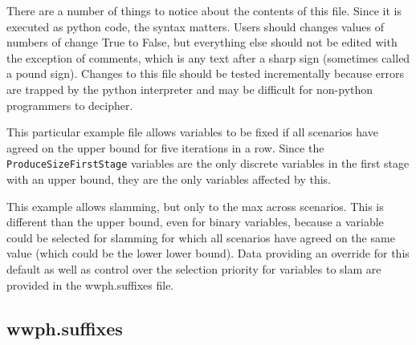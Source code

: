 There are a number of things to notice about the contents of this file. Since it is executed
as python code, the syntax matters. Users should changes values of numbers of change True to False, but 
everything else should not be edited with the exception of comments, which is any text after a sharp sign 
(sometimes called a pound sign). Changes to this file should be tested incrementally because errors are trapped by
the python interpreter and may be difficult for non-python programmers to decipher.

This particular example file allows variables to be fixed if all scenarios have agreed on the 
upper bound for five iterations in a row. Since the \verb|ProduceSizeFirstStage| variables are the only discrete
variables in the first stage with an upper bound, they are the only variables affected by this.

This example allows slamming, but only to the max across scenarios. This is different than the upper bound, even for
binary variables, because a variable could be selected for slamming for which all scenarios have agreed on the same value
(which could be the lower lower bound). Data providing an override for this default as well as control over the selection priority for variables to slam are provided in the wwph.suffixes file.

\subsection{wwph.suffixes}

